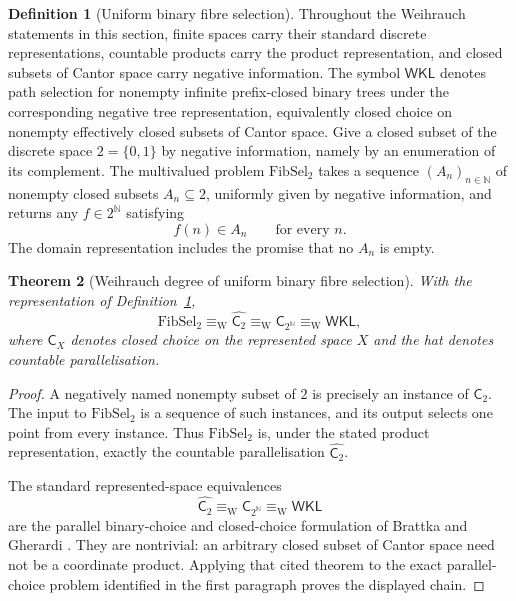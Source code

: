 \documentclass[11pt]{article}
\theoremstyle{plain}
\newtheorem{theorem}{Theorem}[section]
\theoremstyle{definition}
\newtheorem{definition}[theorem]{Definition}
\theoremstyle{remark}
\newcommand{\N}{\mathbb{N}}
\begin{document}
\begin{definition}[Uniform binary fibre selection]
\label{def:fibsel-weihrauch}
Throughout the Weihrauch statements in this section, finite spaces carry their
standard discrete representations, countable products carry the product
representation, and closed subsets of Cantor space carry negative information.
The symbol $\mathsf{WKL}$ denotes path selection for nonempty infinite
prefix-closed binary trees under the corresponding negative tree representation,
equivalently closed choice on nonempty effectively closed subsets of Cantor
space. Give a closed subset of the discrete space $2=\{0,1\}$ by negative
information, namely by an enumeration of its complement. The multivalued
problem $\mathrm{FibSel}_2$ takes a sequence $(A_n)_{n\in\N}$ of nonempty closed
subsets $A_n\subseteq2$, uniformly given by negative information, and returns
any $f\in2^\N$ satisfying
\[
f(n)\in A_n\qquad\text{for every }n.
\]
The domain representation includes the promise that no $A_n$ is empty.
\end{definition}

\begin{theorem}[Weihrauch degree of uniform binary fibre selection]
\label{thm:fibsel-weihrauch}
With the representation of Definition~\ref{def:fibsel-weihrauch},
\[
\mathrm{FibSel}_2
\equiv_{\mathrm W}
\widehat{\mathsf C_2}
\equiv_{\mathrm W}
\mathsf C_{2^\N}
\equiv_{\mathrm W}
\mathsf{WKL},
\]
where $\mathsf C_X$ denotes closed choice on the represented space $X$ and the
hat denotes countable parallelisation.
\end{theorem}

\begin{proof}
A negatively named nonempty subset of $2$ is precisely an instance of
$\mathsf C_2$. The input to $\mathrm{FibSel}_2$ is a sequence of such instances,
and its output selects one point from every instance. Thus
$\mathrm{FibSel}_2$ is, under the stated product representation, exactly the
countable parallelisation $\widehat{\mathsf C_2}$.

The standard represented-space equivalences
\[
\widehat{\mathsf C_2}
\equiv_{\mathrm W}\mathsf C_{2^\N}
\equiv_{\mathrm W}\mathsf{WKL}
\]
are the parallel binary-choice and closed-choice formulation of
Brattka and Gherardi \cite{brattkagherardi}. They are nontrivial:
an arbitrary closed subset of Cantor space need not be a coordinate product.
Applying that cited theorem to the exact parallel-choice problem identified in
the first paragraph proves the displayed chain.
\end{proof}
\end{document}
